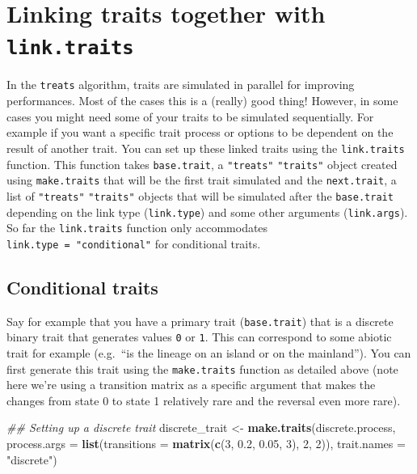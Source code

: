 \documentclass[
]{book}
\newenvironment{Shaded}{\begin{snugshade}}{\end{snugshade}}
\newcommand{\CommentTok}[1]{\textcolor[rgb]{0.56,0.35,0.01}{\textit{#1}}}
\newcommand{\DataTypeTok}[1]{\textcolor[rgb]{0.13,0.29,0.53}{#1}}
\newcommand{\DecValTok}[1]{\textcolor[rgb]{0.00,0.00,0.81}{#1}}
\newcommand{\FloatTok}[1]{\textcolor[rgb]{0.00,0.00,0.81}{#1}}
\newcommand{\KeywordTok}[1]{\textcolor[rgb]{0.13,0.29,0.53}{\textbf{#1}}}
\newcommand{\NormalTok}[1]{#1}
\newcommand{\StringTok}[1]{\textcolor[rgb]{0.31,0.60,0.02}{#1}}
\begin{document}
\hypertarget{linking-traits-together-with-link.traits}{%
\section{\texorpdfstring{Linking traits together with \texttt{link.traits}}{Linking traits together with link.traits}}\label{linking-traits-together-with-link.traits}}

In the \texttt{treats} algorithm, traits are simulated in parallel for improving performances.
Most of the cases this is a (really) good thing!
However, in some cases you might need some of your traits to be simulated sequentially.
For example if you want a specific trait process or options to be dependent on the result of another trait.
You can set up these linked traits using the \texttt{link.traits} function.
This function takes \texttt{base.trait}, a \texttt{"treats"} \texttt{"traits"} object created using \texttt{make.traits} that will be the first trait simulated and the \texttt{next.trait}, a list of \texttt{"treats"} \texttt{"traits"} objects that will be simulated after the \texttt{base.trait} depending on the link type (\texttt{link.type}) and some other arguments (\texttt{link.args}).
So far the \texttt{link.traits} function only accommodates \texttt{link.type\ =\ "conditional"} for conditional traits.

\hypertarget{conditional-traits}{%
\subsection{Conditional traits}\label{conditional-traits}}

Say for example that you have a primary trait (\texttt{base.trait}) that is a discrete binary trait that generates values \texttt{0} or \texttt{1}.
This can correspond to some abiotic trait for example (e.g.~``is the lineage on an island or on the mainland'').
You can first generate this trait using the \texttt{make.traits} function as detailed above (note here we're using a transition matrix as a specific argument that makes the changes from state 0 to state 1 relatively rare and the reversal even more rare).

\begin{Shaded}
\begin{Highlighting}[]
\CommentTok{\#\# Setting up a discrete trait}
\NormalTok{discrete\_trait \textless{}{-}}\StringTok{ }\KeywordTok{make.traits}\NormalTok{(discrete.process,}
       \DataTypeTok{process.args =} \KeywordTok{list}\NormalTok{(}\DataTypeTok{transitions =} \KeywordTok{matrix}\NormalTok{(}\KeywordTok{c}\NormalTok{(}\DecValTok{3}\NormalTok{, }\FloatTok{0.2}\NormalTok{, }\FloatTok{0.05}\NormalTok{, }\DecValTok{3}\NormalTok{), }\DecValTok{2}\NormalTok{, }\DecValTok{2}\NormalTok{)),}
       \DataTypeTok{trait.names  =} \StringTok{"discrete"}\NormalTok{)}
\end{Highlighting}
\end{Shaded}
\end{document}
